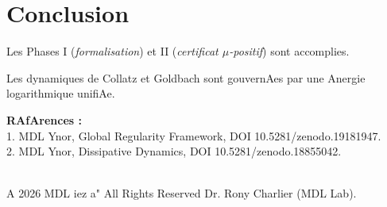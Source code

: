 \documentclass[12pt]{article}
\begin{document}
\section*{Conclusion} 

Les Phases I (\emph{formalisation}) et II (\emph{certificat $\mu$-positif}) sont accomplies.

Les dynamiques de Collatz et Goldbach sont gouvernAes par une Anergie logarithmique unifiAe.



\bigskip 

\noindent\textbf{RAfArences :}\\ 

1. MDL Ynor, Global Regularity Framework, DOI 10.5281/zenodo.19181947. \\

2. MDL Ynor, Dissipative Dynamics, DOI 10.5281/zenodo.18855042.



\medskip

 \\

A 2026 MDL iez a" All Rights Reserved Dr. Rony Charlier (MDL Lab).
\end{document}

